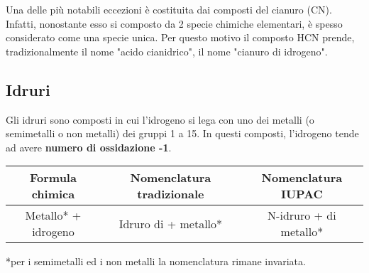 \documentclass[10pt,a4paper]{article}
\begin{document}
 	Una delle più notabili eccezioni è costituita dai composti del cianuro (CN). Infatti, nonostante esso si composto da 2 specie chimiche elementari, è spesso considerato come una specie unica. Per questo motivo il composto HCN prende, tradizionalmente il nome "acido cianidrico", il nome "cianuro di idrogeno".
 	
 \subsection*{Idruri}
 
	Gli idruri sono composti in cui l'idrogeno si lega con uno dei metalli (o semimetalli o non metalli) dei gruppi 1 a 15. In questi composti, l'idrogeno tende ad avere \textbf{numero di ossidazione -1}.
	
	\begin{tabular}{|c|c|c|}
		\hline
		Formula chimica & Nomenclatura tradizionale & Nomenclatura IUPAC \\
		\hline
		Metallo*  + idrogeno & Idruro di + metallo*  & N-idruro + di metallo*  \\
		\hline
	\end{tabular}
	
	*per i semimetalli ed i non metalli la nomenclatura rimane invariata.
	
\end{document}
